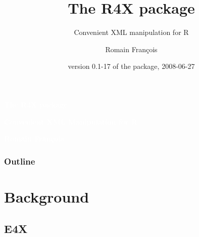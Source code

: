 \documentclass[smaller]{beamer}
\title{The R4X package}
\subtitle{Convenient XML manipulation for R}
\author{Romain Fran\c{c}ois}
\date{ version 0.1-17 of the package, 2008-06-27 }
\begin{document}
{
 \begin{frame}[plain]
\begin{center}

\begin{Huge}\textcolor{white}{\sf \bfseries The R4X package}\end{Huge}

\begin{Large}\textcolor{white}{\sf \bfseries Convenient XML Manipulation for R}\end{Large}
 
\end{center}

\begin{flushright}
 \begin{Large}
\textcolor{white}{\sf \bfseries Romain Fran\c{c}ois}  
 \end{Large}
\end{flushright}


 \end{frame}
}


\begin{frame}[fragile]
\frametitle{Outline}
\tableofcontents
\end{frame}

\section{Background}

\subsection{E4X}
\end{document}
